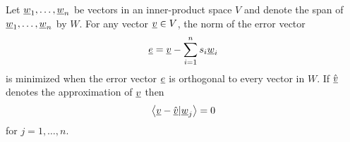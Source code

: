 \begin{theorem}
Let $\underline{w}_1, \ldots, \underline{w}_n$ be vectors in an inner-product space $V$ and denote the span of $\underline{w}_1, \ldots, \underline{w}_n$ by $W$.
For any vector $\underline{v} \in V$, the norm of the error vector
\begin{equation} \label{equation:OrthogonalProjectionError}
\underline{e} = \underline{v} - \sum_{i=1}^n s_i \underline{w}_i
\end{equation}
is minimized when the error vector $\underline{e}$ is orthogonal to every vector in $W$.
If $\hat{\underline{v}}$ denotes the  approximation of $\underline{v}$ then
\begin{equation*}
\left\langle \underline{v} - \hat{\underline{v}} | \underline{w}_j \right\rangle = 0
\end{equation*}
for $j = 1, \ldots, n$.
\end{theorem}
